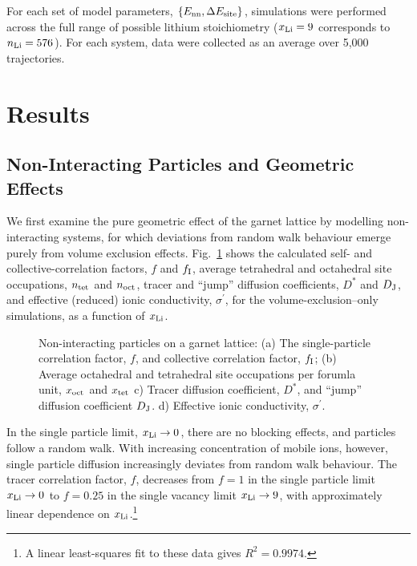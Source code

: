 \documentclass[aps,prb,twocolumn,superscriptaddress,reprint]{revtex4-1}
\newcommand{\set}[1]{\left\{#1\right\}}
\newcommand{\xLi}{x_\m{Li}}
\begin{document}
For each set of model parameters, $\set{E_\m{nn}, \Delta E_\m{site}}$, simulations were performed across the full range of possible lithium stoichiometry ($\xLi=9$ corresponds to $n_{\mathrm{Li}}=576$). 
For each system, data were collected as an average over 5,000 trajectories. 

\section{Results}
\subsection{Non-Interacting Particles and Geometric Effects}
We first examine the pure geometric effect of the garnet lattice by modelling non-interacting systems, for which deviations from random walk behaviour emerge purely from volume exclusion effects. 
Fig.~\ref{fig:non-interacting_data} shows the calculated self- and collective-correlation factors, $f$ and $f_{\mathrm{I}}$, average tetrahedral and octahedral site occupations, $n_{\mathrm{tet}}$ and $n_{\mathrm{oct}}$, tracer and ``jump'' diffusion coefficients, $D^*$ and $D_{\mathrm{J}}$, and effective (reduced) ionic conductivity, $\sigma^\prime$, for the volume-exclusion--only simulations, as a function of $\xLi$.

\begin{figure}[tb]
  \centering
    \caption{\label{fig:non-interacting_data}Non-interacting particles on a garnet lattice: (a) The single-particle correlation factor, $f$, and collective correlation factor, $f_{\mathrm{I}}$; (b) Average octahedral and tetrahedral site occupations per forumla unit, $x_{\mathrm{oct}}$ and $x_{\mathrm{tet}}$ c) Tracer diffusion coefficient, $D^*$, and ``jump'' diffusion coefficient $D_{\mathrm{J}}$. d) Effective ionic conductivity, $\sigma^\prime$.}
\end{figure}

In the single particle limit, $\xLi\to0$, there are no blocking effects, and particles follow a random walk. 
With increasing concentration of mobile ions, however, single particle diffusion increasingly deviates from random walk behaviour. 
The tracer correlation factor, $f$, decreases from $f=1$ in the single particle limit $\xLi\to0$ to $f=0.25$ in the single vacancy limit $\xLi\to9$, with approximately linear dependence on $\xLi$.\footnote{A linear least-squares fit to these data gives $R^2=0.9974$.}
\end{document}
